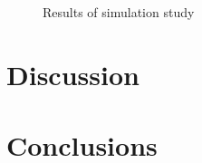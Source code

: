 \begin{figure}
    \centering
    \caption{Results of simulation study}
    \label{fig:coverage}
\end{figure}

\section*{Discussion}

\section*{Conclusions}

